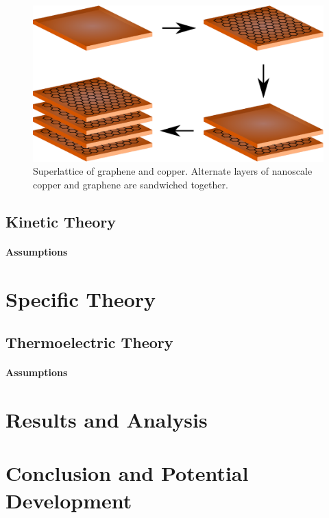 \documentclass[12pt,draft]{article}
\begin{document}
\begin{figure}
	\label{fig:superlattice}
	\centering
	\includegraphics[width=\textwidth]{graphene-superlattice.eps}
	\caption{Superlattice of graphene and copper. Alternate layers of nanoscale copper and graphene are sandwiched together.}
\end{figure}

\subsection{Kinetic Theory}
\paragraph{Assumptions}

\section{Specific Theory}
\subsection{Thermoelectric Theory}
\paragraph{Assumptions}

\section{Results and Analysis}

\section{Conclusion and Potential Development}
\end{document}
